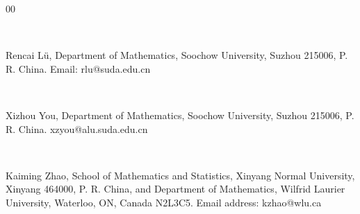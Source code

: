 \documentclass[1p]{elsarticle}
\numberwithin{equation}{section}
\begin{document}
\begin{thebibliography}{00}

\end{thebibliography}

 

\

Rencai L\"u,  Department of Mathematics, Soochow University, Suzhou 215006, P. R. China. Email: rlu@suda.edu.cn

\

Xizhou You, Department of Mathematics, Soochow University, Suzhou 215006, P. R. China.  xzyou@alu.suda.edu.cn


\

Kaiming Zhao,  School of Mathematics and Statistics,
Xinyang Normal University,
Xinyang 464000, P. R. China, and Department of Mathematics, Wilfrid Laurier University, Waterloo, ON, Canada N2L3C5. Email address: kzhao@wlu.ca


%
\end{document}
